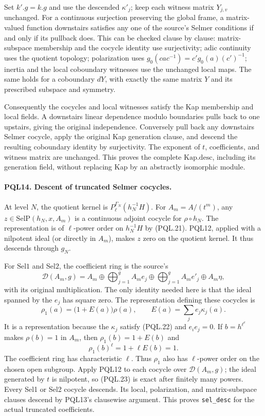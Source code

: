 Set \(k'.g=k.g\) and use the descended \(\kappa'_j\);
keep each witness matrix \(Y_{j,v}\) unchanged.
For a continuous surjection preserving the global frame,
a matrix-valued function downstairs satisfies any one of
the source's Selmer conditions if and only if its pullback
does. This can be checked clause by clause: matrix-subspace
membership and the cocycle identity use surjectivity;
adic continuity uses the quotient topology; polarization
uses \(g_0(cac^{-1})=c'g_0(a)(c')^{-1}\); inertia and the
local coboundary witnesses use the unchanged local maps.
The same holds for a coboundary \(dY\), with exactly the
same matrix \(Y\) and its prescribed subspace and symmetry.

Consequently the cocycles and local witnesses satisfy
the Kap membership and local fields. A downstairs
linear dependence modulo boundaries pulls back to
one upstairs, giving the original independence.
Conversely pull back any downstairs Selmer cocycle,
apply the original Kap generation clause, and descend
the resulting coboundary identity by surjectivity.
The exponent of \(t\), coefficients, and witness matrix
are unchanged. This proves the complete \(\mathrm{Kap.desc}\),
including its generation field, without replacing Kap
by an abstractly isomorphic module.

\paragraph{PQL14. Descent of truncated Selmer cocycles.}\label{claim:PQL14}
At level \(N\), the quotient kernel is
\(P_\ell^{\Gamma_N}(h_N^{-1}H)\).
For \(A_m=A/(t^m)\), any
\(z\in\mathrm{SelP}(h_N,x,A_m)\) is a continuous
adjoint cocycle for \(\rho\circ h_N\).
The representation is of \(\ell\)-power order on \(h_N^{-1}H\)
by (PQL.21). PQL12, applied with a nilpotent ideal
(or directly in \(A_m\)), makes \(z\) zero on the
quotient kernel. It thus descends through \(g_N\).

For \(\mathrm{Sel1}\) and \(\mathrm{Sel2}\), the coefficient
ring is the source's
\[
 \mathcal D(A_m,g)=
 A_m\oplus\bigoplus_{j=1}^g A_m e_j
       \oplus\bigoplus_{j=1}^g A_m e'_j\oplus A_m\eta ,
\]
with its original multiplication. The only identity needed
here is that the ideal spanned by the \(e_j\) has square zero.
The representation defining these cocycles is
\[
 \rho_1(a)=\bigl(1+E(a)\bigr)\rho(a),\qquad
 E(a)=\sum_j e_j\kappa_j(a).                         \tag{PQL.25}
\]
It is a representation because the \(\kappa_j\) satisfy
(PQL.22) and \(e_ie_j=0\).
If \(b=h^{\ell^e}\) makes \(\rho(b)=1\) in \(A_m\),
then \(\rho_1(b)=1+E(b)\) and
\[
 \rho_1(b)^\ell=1+\ell E(b)=1.
\]
The coefficient ring has characteristic \(\ell\).
Thus \(\rho_1\) also has \(\ell\)-power order on the
chosen open subgroup. Apply PQL12 to each cocycle
over \(\mathcal D(A_m,g)\); the ideal generated by \(t\)
is nilpotent, so (PQL.23) is exact after finitely many
powers. Every Sel1 or Sel2 cocycle descends. Its local,
polarization, and matrix-subspace clauses descend by
PQL13's clausewise argument. This proves
\texttt{sel\_desc} for the actual truncated coefficients.

